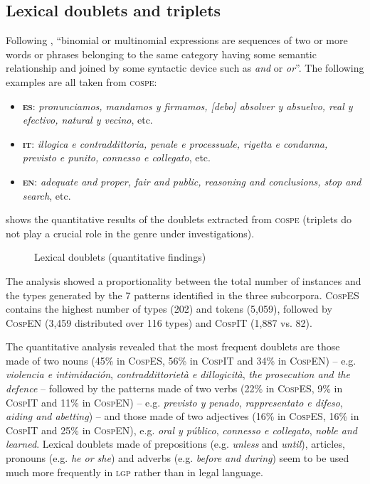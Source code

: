 \documentclass[output=paper]{LSP/langsci}
\begin{document}
\subsection{Lexical doublets and triplets}
Following \citet[90]{Bhatia1984}, “binomial or multinomial expressions are sequences of two or more words or phrases belonging to the same category having some semantic relationship and joined by some syntactic device such as \textit{and} or \textit{or}”. The following examples are all taken from \textsc{cospe}:

\begin{itemize}
\item \textbf{\textsc{es}}: \textit{pronunciamos, mandamos y firmamos, [debo] absolver y absuelvo, real y efectivo, natural y vecino}, etc.
\item \textbf{\textsc{it}}: \textit{illogica e contraddittoria, penale e processuale, rigetta e condanna, previsto e punito, connesso e collegato}, etc.
\item \textbf{\textsc{en}}: \textit{adequate and proper, fair and public, reasoning and conclusions, stop and search}, etc.
\end{itemize}

 shows the quantitative results of the doublets extracted from \textsc{cospe} (triplets do not play a crucial role in the genre under investigations).

\begin{figure}

\caption{Lexical doublets (quantitative findings)} \label{fig:6:2}
\end{figure}

The analysis showed a proportionality between the total number of instances and the types generated by the 7 patterns identified in the three subcorpora. \textsc{CospES} contains the highest number of types (202) and tokens (5,059), followed by \textsc{CospEN} (3,459 distributed over 116 types) and \textsc{\textsc{CospIT}} (1,887 vs. 82).

The quantitative analysis revealed that the most frequent doublets are those made of two nouns (45\% in \textsc{CospES}, 56\% in \textsc{\textsc{CospIT}} and 34\% in \textsc{CospEN}) – e.g. \textit{violencia e intimidación}, \textit{contraddittorietà e dillogicità}, \textit{the prosecution and the defence} – followed by the patterns made of two verbs (22\% in \textsc{CospES}, 9\% in \textsc{\textsc{CospIT}} and 11\% in \textsc{CospEN}) – e.g. \textit{previsto y penado}, \textit{rappresentato e difeso}, \textit{aiding and abetting}) – and those made of two adjectives (16\% in \textsc{CospES}, 16\% in \textsc{\textsc{CospIT}} and 25\% in \textsc{CospEN}), e.g. \textit{oral y público}, \textit{connesso e collegato}, \textit{noble and learned}. Lexical doublets made of prepositions (e.g. \textit{unless} and \textit{until}), articles, pronouns (e.g. \textit{he or she}) and adverbs (e.g. \textit{before and during}) seem to be used much more frequently in \textsc{lgp} rather than in legal language.
\end{document}

